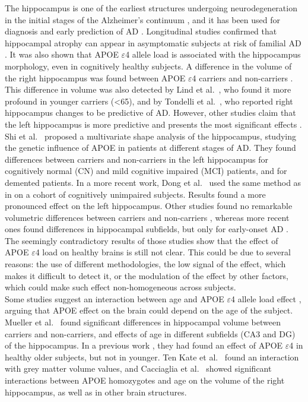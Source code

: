 The hippocampus is one of the earliest structures undergoing neurodegeneration in the initial stages of the Alzheimer's continuum \cite{Pievani2011}, and it has been used for diagnosis and early prediction of AD \cite{Sanroma2017}. Longitudinal studies confirmed that hippocampal atrophy can appear in asymptomatic subjects at risk of familial AD \cite{Fox1996}. It was also shown that APOE $\varepsilon$4 allele load is associated with the hippocampus morphology, even in cognitively healthy subjects. A difference in the volume of the right hippocampus was found between APOE $\varepsilon$4 carriers and non-carriers \cite{ODwyer2012}. This difference in volume was also detected by Lind et al.\ \cite{Lind2006}, who found it more profound in younger carriers (<65), and by Tondelli et al.\ \cite{Tondelli2012}, who reported right hippocampus changes to be predictive of AD. However, other studies claim that the left hippocampus is more predictive and presents the most significant effects \cite{Csernansky2005}. Shi et al.\ \cite{Shi2014} proposed a multivariate shape analysis of the hippocampus, studying the genetic influence of APOE in patients at different stages of AD. They found differences between carriers and non-carriers in the left hippocampus for cognitively normal (CN) and mild cognitive impaired (MCI) patients, and for demented patients. In a more recent work, Dong et al.\ \cite{Dong2019} used the same method as in \cite{Shi2014} on a cohort of cognitively unimpaired subjects. Results found a more pronounced effect on the left hippocampus. Other studies found no remarkable volumetric differences between carriers and non-carriers \cite{Hostage2013,Protas2013}, whereas more recent ones found differences in hippocampal subfields, but only for early-onset AD \cite{Parker2019}. The seemingly contradictory results of those studies show that the effect of APOE $\varepsilon$4 load on healthy brains is still not clear. This could be due to several reasons: the use of different methodologies, the low signal of the effect, which makes it difficult to detect it, or the modulation of the effect by other factors, which could make such effect non-homogeneous across subjects. \\

Some studies suggest an interaction between age and APOE $\varepsilon$4 allele load effect \cite{Tuminello2011}, arguing that APOE effect on the brain could depend on the age of the subject. Mueller et al.\ \cite{Mueller2009} found significant differences in hippocampal volume between carriers and non-carriers, and effects of age in different subfields (CA3 and DG) of the hippocampus. In a previous work \cite{Mueller2008}, they had found an effect of APOE $\varepsilon$4 in healthy older subjects, but not in younger. Ten Kate et al.\ \cite{TenKate2016} found an interaction with grey matter volume values, and Cacciaglia et al.\ \cite{Cacciaglia2018} showed significant interactions between APOE homozygotes and age on the volume of the right hippocampus, as well as in other brain structures. \\

